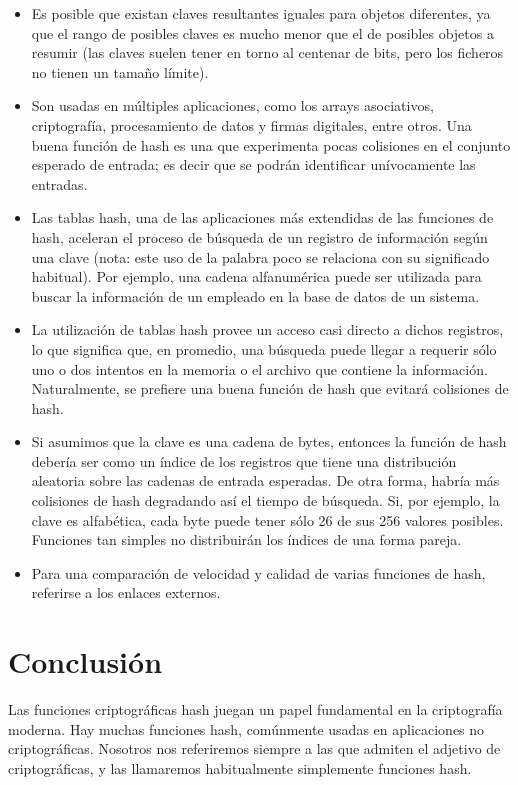 \documentclass[letterpaper,openright,12pt]{report}
\begin{document}
\begin{itemize}
\itemsep1pt\parskip0pt
\item
  Es posible que existan claves resultantes iguales para objetos
  diferentes, ya que el rango de posibles claves es mucho menor que el
  de posibles objetos a resumir (las claves suelen tener en torno al
  centenar de bits, pero los ficheros no tienen un tamaño límite).
\item
  Son usadas en múltiples aplicaciones, como los arrays asociativos,
  criptografía, procesamiento de datos y firmas digitales, entre otros.
  Una buena función de hash es una que experimenta pocas colisiones en
  el conjunto esperado de entrada; es decir que se podrán identificar
  unívocamente las entradas.
\item
  Las tablas hash, una de las aplicaciones más extendidas de las
  funciones de hash, aceleran el proceso de búsqueda de un registro de
  información según una clave (nota: este uso de la palabra poco se
  relaciona con su significado habitual). Por ejemplo, una cadena
  alfanumérica puede ser utilizada para buscar la información de un
  empleado en la base de datos de un sistema.
\item
  La utilización de tablas hash provee un acceso casi directo a dichos
  registros, lo que significa que, en promedio, una búsqueda puede
  llegar a requerir sólo uno o dos intentos en la memoria o el archivo
  que contiene la información. Naturalmente, se prefiere una buena
  función de hash que evitará colisiones de hash.
\item
  Si asumimos que la clave es una cadena de bytes, entonces la función
  de hash debería ser como un índice de los registros que tiene una
  distribución aleatoria sobre las cadenas de entrada esperadas. De otra
  forma, habría más colisiones de hash degradando así el tiempo de
  búsqueda. Si, por ejemplo, la clave es alfabética, cada byte puede
  tener sólo 26 de sus 256 valores posibles. Funciones tan simples no
  distribuirán los índices de una forma pareja.
\item
  Para una comparación de velocidad y calidad de varias funciones de
  hash, referirse a los enlaces externos.
\end{itemize}
\newpage
\section{Conclusión}

Las funciones criptográficas hash juegan un papel fundamental en la criptografía moderna. Hay muchas funciones hash, comúnmente usadas en aplicaciones no criptográficas. Nosotros nos referiremos siempre a las que admiten el adjetivo de criptográficas, y las llamaremos habitualmente simplemente funciones hash. 
\end{document}
